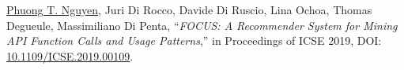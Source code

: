 \documentclass[a4paper,8pt]{article} %
\begin{document}
\begin{thebibliography}{100}
%		
%	
			
	\underline{Phuong T. Nguyen}, Juri Di Rocco, Davide Di Ruscio, Lina Ochoa, Thomas Degueule, Massimiliano Di Penta, ``\emph{FOCUS: A Recommender System for Mining API Function Calls and Usage Patterns},'' in Proceedings of ICSE 2019, DOI: \href{https://doi.org/10.1109/ICSE.2019.00109}{10.1109/ICSE.2019.00109}. %
	
		

\end{thebibliography}
\end{document}
